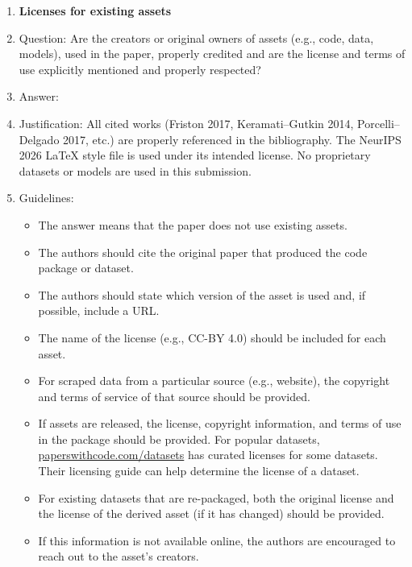 \begin{enumerate}
\item {\bf Licenses for existing assets}
    \item[] Question: Are the creators or original owners of assets (e.g., code, data, models), used in the paper, properly credited and are the license and terms of use explicitly mentioned and properly respected?
    \item[] Answer: \answerYes{}
    \item[] Justification: All cited works (Friston 2017, Keramati--Gutkin 2014, Porcelli--Delgado 2017, etc.) are properly referenced in the bibliography. The NeurIPS 2026 LaTeX style file is used under its intended license. No proprietary datasets or models are used in this submission.
    \item[] Guidelines:
    \begin{itemize}
        \item The answer \answerNA{} means that the paper does not use existing assets.
        \item The authors should cite the original paper that produced the code package or dataset.
        \item The authors should state which version of the asset is used and, if possible, include a URL.
        \item The name of the license (e.g., CC-BY 4.0) should be included for each asset.
        \item For scraped data from a particular source (e.g., website), the copyright and terms of service of that source should be provided.
        \item If assets are released, the license, copyright information, and terms of use in the package should be provided. For popular datasets, \url{paperswithcode.com/datasets} has curated licenses for some datasets. Their licensing guide can help determine the license of a dataset.
        \item For existing datasets that are re-packaged, both the original license and the license of the derived asset (if it has changed) should be provided.
        \item If this information is not available online, the authors are encouraged to reach out to the asset's creators.
    \end{itemize}


\end{enumerate}
